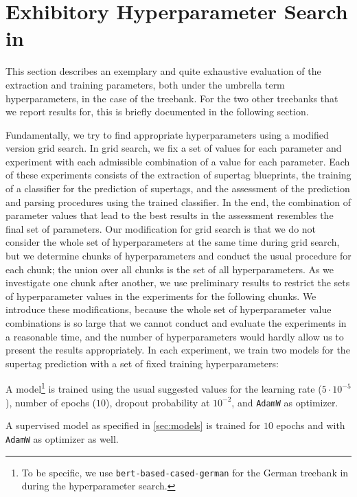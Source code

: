 \documentclass[../../document.tex]{subfiles}
\begin{document}
    \section{Exhibitory Hyperparameter Search in }\label{sec:gridsearch}
    This section describes an exemplary and quite exhaustive evaluation of the extraction and training parameters, both under the umbrella term hyperparameters, in the case of the \negra{} treebank.
    For the two other treebanks that we report results for, this is briefly documented in the following section.
    
    Fundamentally, we try to find appropriate hyperparameters using a modified version grid search.
    In grid search, we fix a set of values for each parameter and experiment with each admissible combination of a value for each parameter.
    Each of these experiments consists of the extraction of supertag blueprints, the training of a classifier for the prediction of supertags, and the assessment of the prediction and parsing procedures using the trained classifier.
    In the end, the combination of parameter values that lead to the best results in the assessment resembles the final set of parameters.
    Our modification for grid search is that we do not consider the whole set of hyperparameters at the same time during grid search, but we determine chunks of hyperparameters and conduct the usual procedure for each chunk; the union over all chunks is the set of all hyperparameters.
    As we investigate one chunk after another, we use preliminary results to restrict the sets of hyperparameter values in the experiments for the following chunks.
    We introduce these modifications, because the whole set of hyperparameter value combinations is so large that we cannot conduct and evaluate the experiments in a reasonable time, and the number of hyperparameters would hardly allow us to present the results appropriately.
    In each experiment, we train two models for the supertag prediction with a set of fixed training hyperparameters:
    \begin{compactitem}
        \item A  model\footnote{
            To be specific, we use \texttt{bert-based-cased-german} for the German \negra{} treebank in during the hyperparameter search.
        } is trained using the usual suggested values for the learning rate ($5\cdot 10^{-5}$), number of epochs ($10$), dropout probability at \(10^{-2}\), and \texttt{AdamW} as optimizer.
        \item A supervised model as specified in \cref{sec:models} is trained for $10$ epochs and with \texttt{AdamW} as optimizer as well.
    \end{compactitem}
\end{document}
